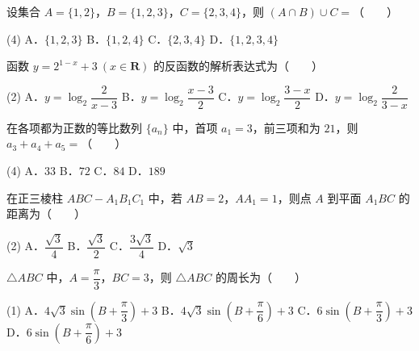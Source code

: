 
\begin{question}
设集合 $A = \{1, 2\}$，$B = \{1, 2, 3\}$，$C = \{2, 3, 4\}$，则 $(A \cap B) \cup C =$\mbox{（　　）}

\begin{gkopts}(4)
\task A．$\{1, 2, 3\}$
\task B．$\{1, 2, 4\}$
\task C．$\{2, 3, 4\}$
\task D．$\{1, 2, 3, 4\}$
\end{gkopts}

\end{question}
\begin{question}
函数 $y = 2^{1-x} + 3\ (x \in \mathbf{R})$ 的反函数的解析表达式为\mbox{（　　）}

\begin{gkopts}(2)
\task A．$y = \log_2 \dfrac{2}{x-3}$
\task B．$y = \log_2 \dfrac{x-3}{2}$
\task C．$y = \log_2 \dfrac{3-x}{2}$
\task D．$y = \log_2 \dfrac{2}{3-x}$
\end{gkopts}

\end{question}
\begin{question}
在各项都为正数的等比数列 $\{a_n\}$ 中，首项 $a_1 = 3$，前三项和为 $21$，则 $a_3 + a_4 + a_5 =$\mbox{（　　）}

\begin{gkopts}(4)
\task A．$33$
\task B．$72$
\task C．$84$
\task D．$189$
\end{gkopts}

\end{question}
\begin{question}
在正三棱柱 $ABC - A_1B_1C_1$ 中，若 $AB = 2$，$AA_1 = 1$，则点 $A$ 到平面 $A_1BC$ 的距离为\mbox{（　　）}

\begin{gkopts}(2)
\task A．$\dfrac{\sqrt{3}}{4}$
\task B．$\dfrac{\sqrt{3}}{2}$
\task C．$\dfrac{3\sqrt{3}}{4}$
\task D．$\sqrt{3}$
\end{gkopts}

\end{question}
\begin{question}
$\triangle ABC$ 中，$A = \dfrac{\pi}{3}$，$BC = 3$，则 $\triangle ABC$ 的周长为\mbox{（　　）}

\begin{gkopts}(1)
\task A．$4\sqrt{3}\sin\left(B + \dfrac{\pi}{3}\right) + 3$
\task B．$4\sqrt{3}\sin\left(B + \dfrac{\pi}{6}\right) + 3$
\task C．$6\sin\left(B + \dfrac{\pi}{3}\right) + 3$
\task D．$6\sin\left(B + \dfrac{\pi}{6}\right) + 3$
\end{gkopts}

\end{question}
